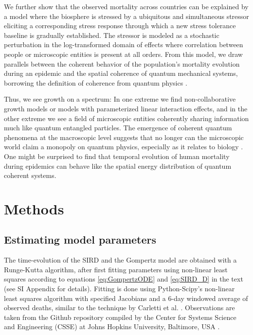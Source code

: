 \documentclass[sn-mathphys]{sn-jnl}%
\theoremstyle{thmstyleone}%
\theoremstyle{thmstyletwo}%
\theoremstyle{thmstylethree}%
\begin{document}
We further show that the observed mortality across countries can be explained by a model where the biosphere is stressed by a ubiquitous and simultaneous stressor eliciting a corresponding stress response through which a new stress tolerance baseline is gradually established. The stressor is modeled as a stochastic perturbation in the log-transformed domain of effects where correlation between people or microscopic entities is present at all orders. From this model, we draw parallels between the coherent behavior of the population's mortality evolution during an epidemic and the spatial coherence of quantum mechanical systems, borrowing the definition of coherence from quantum physics \cite{molski2003coherent}.

Thus, we see growth on a spectrum: In one extreme we find non-collaborative growth models or models with parameterized linear interaction effects, and in the other extreme we see a field of microscopic entities coherently sharing information much like quantum entangled particles. The emergence of coherent quantum phenomena at the macroscopic level suggests that no longer can the microscopic world claim a monopoly on quantum physics, especially as it relates to biology \cite{lambert2013quantum}. One might be surprised to find that temporal evolution of human mortality during epidemics can behave like the spatial energy distribution of quantum coherent systems.

\section*{Methods}

\subsection*{Estimating model parameters}
The time-evolution of the SIRD and the Gompertz model are obtained with a Runge-Kutta algorithm, after first fitting parameters using non-linear least squares according to equations \ref{eq:GompertzODE} and \ref{eq:SIRD_D} in the text (see SI Appendix for details). 
Fitting is done using Python-Scipy's non-linear least squares algorithm with specified Jacobians and a 6-day windowed average of observed deaths, similar to the technique by Carletti et al. \cite{carletti2020covid}. 
Observations are taken from the Github repository compiled by the Center for Systems Science and Engineering (CSSE) at Johns Hopkins University, Baltimore, USA \cite{dong2020interactive}. 
\end{document}
